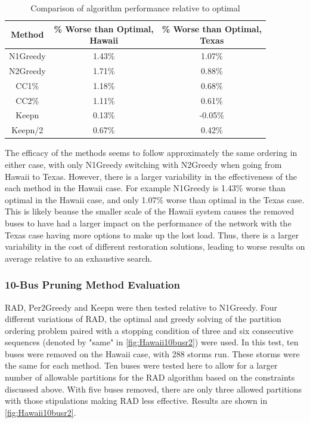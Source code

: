 \documentclass[12pt]{article}
\begin{document}
\begin{table}[ht]
    \centering
    \renewcommand{\arraystretch}{1.2} %
    \begin{tabular}{|c|c|c|}
        \hline
        \textbf{Method} & \makecell{\% Worse than Optimal, \\ Hawaii} & \makecell{\% Worse than Optimal, \\ Texas} \\
        \hline
        N1Greedy & 1.43\% & 1.07\% \\
        \hline
        N2Greedy & 1.71\% & 0.88\% \\
        \hline
        CC1\% & 1.18\% & 0.68\% \\
        \hline
        CC2\% & 1.11\% & 0.61\% \\
        \hline
        Keepn & 0.13\% & -0.05\% \\
        \hline
        Keepn/2 & 0.67\% & 0.42\% \\
        \hline
    \end{tabular}
    \caption{Comparison of algorithm performance relative to optimal}
    \label{tab:r1results}
\end{table}

The efficacy of the methods seems to follow approximately the same ordering in either case, with only N1Greedy switching with N2Greedy when going from Hawaii to Texas. However, there is a larger variability in the effectiveness of the each method in the Hawaii case. For example N1Greedy is 1.43\% worse than optimal in the Hawaii case, and only 1.07\% worse than optimal in the Texas case. This is likely beause the smaller scale of the Hawaii system causes the removed buses to have had a larger impact on the performance of the network with the Texas case having more options to make up the lost load. Thus, there is a larger variability in the cost of different restoration solutions, leading to worse results on average relative to an exhaustive search. \par

\subsubsection{10-Bus Pruning Method Evaluation}
RAD, Per2Greedy and Keepn were then tested relative to N1Greedy. Four different variations of RAD, the optimal and greedy solving of the partition ordering problem paired with a stopping condition of three and six consecutive sequences (denoted by "same" in \ref{fig:Hawaii10busr2}) were used. In this test, ten buses were removed on the Hawaii case, with 288 storms run. These storms were the same for each method. Ten buses were tested here to allow for a larger number of allowable partitions for the RAD algorithm based on the constraints discussed above. With five buses removed, there are only three allowed partitions with those stipulations making RAD less effective. Results are shown in \ref{fig:Hawaii10busr2}.
\end{document}
